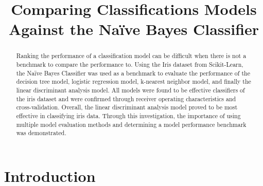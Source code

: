 \documentclass[journal]{IEEEtran}
\begin{document}
\setlength{\emergencystretch}{12pt}
\setlength{\parindent}{10pt}



\lstset{style=mystyle}

\title{Comparing Classifications Models Against the Naïve Bayes Classifier}

\author{
}

\maketitle

\begin{abstract}
\label{log:abstract}

Ranking the performance of a classification model can be difficult when there is not a benchmark to compare the performance to. Using the Iris dataset from Scikit-Learn, the Naïve Bayes Classifier was used as a benchmark to evaluate the performance of the decision tree model, logistic regression model, k-nearest neighbor model, and finally the linear discriminant analysis model. All models were found to be effective classifiers of the iris dataset and were confirmed through receiver operating characteristics and cross-validation. Overall, the linear discriminant analysis model proved to be most effective in classifying iris data. Through this investigation, the importance of using multiple model evaluation methods and determining a model performance benchmark was demonstrated. 

\end{abstract}

\section{Introduction}
\label{sec:intro}
\end{document}
